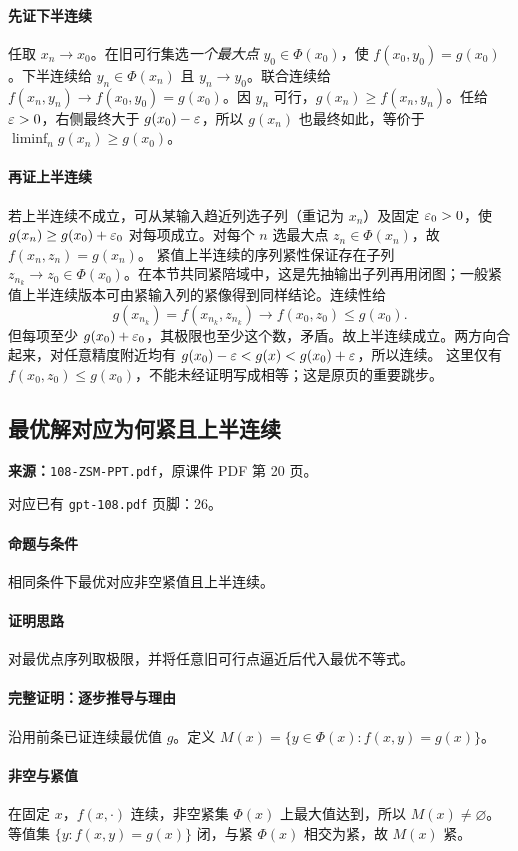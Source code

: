\paragraph{先证下半连续}
任取 $x_n\to x_0$。在旧可行集选\emph{一个最大点} $y_0\in\Phi(x_0)$，使 $f(x_0,y_0)=g(x_0)$。下半连续给 $y_n\in\Phi(x_n)$ 且 $y_n\to y_0$。联合连续给 $f(x_n,y_n)\to f(x_0,y_0)=g(x_0)$。因 $y_n$ 可行，$g(x_n)\ge f(x_n,y_n)$。任给 $\varepsilon>0$，右侧最终大于 $g(x_0)-\varepsilon$，所以 $g(x_n)$ 也最终如此，等价于 $\liminf_n g(x_n)\ge g(x_0)$。
\paragraph{再证上半连续}
若上半连续不成立，可从某输入趋近列选子列（重记为 $x_n$）及固定 $\varepsilon_0>0$，使 $g(x_n)\ge g(x_0)+\varepsilon_0$ 对每项成立。对每个 $n$ 选最大点 $z_n\in\Phi(x_n)$，故 $f(x_n,z_n)=g(x_n)$。
紧值上半连续的序列紧性保证存在子列 $z_{n_k}\to z_0\in\Phi(x_0)$。在本节共同紧陪域中，这是先抽输出子列再用闭图；一般紧值上半连续版本可由紧输入列的紧像得到同样结论。连续性给
\[g(x_{n_k})=f(x_{n_k},z_{n_k})\longrightarrow f(x_0,z_0)\le g(x_0).\]
但每项至少 $g(x_0)+\varepsilon_0$，其极限也至少这个数，矛盾。故上半连续成立。两方向合起来，对任意精度附近均有 $g(x_0)-\varepsilon<g(x)<g(x_0)+\varepsilon$，所以连续。
这里仅有 $f(x_0,z_0)\le g(x_0)$，不能未经证明写成相等；这是原页的重要跳步。

\clearpage\subsection{最优解对应为何紧且上半连续}
\textbf{来源：}\texttt{108-ZSM-PPT.pdf}，原课件 PDF 第 20 页。\par
对应已有 \texttt{gpt-108.pdf} 页脚：26。\par
\paragraph{命题与条件}相同条件下最优对应非空紧值且上半连续。
\paragraph{证明思路}对最优点序列取极限，并将任意旧可行点逼近后代入最优不等式。
\paragraph{完整证明：逐步推导与理由}

沿用前条已证连续最优值 $g$。定义 $M(x)=\{y\in\Phi(x):f(x,y)=g(x)\}$。
\paragraph{非空与紧值}在固定 $x$，$f(x,\cdot)$ 连续，非空紧集 $\Phi(x)$ 上最大值达到，所以 $M(x)\ne\varnothing$。等值集 $\{y:f(x,y)=g(x)\}$ 闭，与紧 $\Phi(x)$ 相交为紧，故 $M(x)$ 紧。

